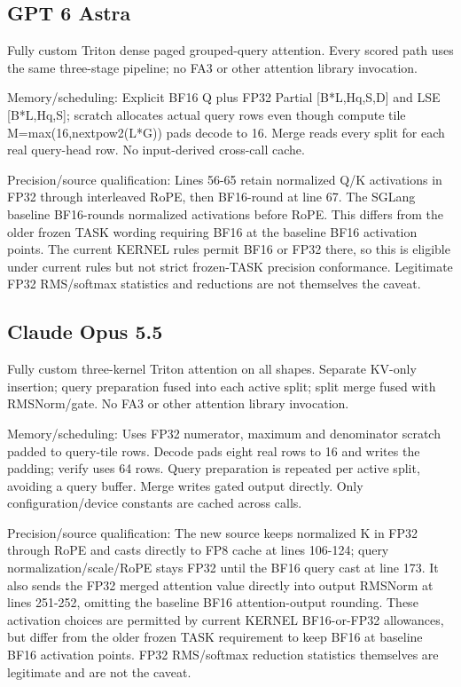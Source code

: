 \documentclass[11pt,letterpaper]{article}
\begin{document}
\subsection*{GPT 6 Astra}

Fully custom Triton dense paged grouped-query attention. Every scored path uses the same three-stage pipeline; no FA3 or other attention library invocation.

Memory/scheduling: Explicit BF16 Q plus FP32 Partial [B*L,Hq,S,D] and LSE [B*L,Hq,S]; scratch allocates actual query rows even though compute tile M=max(16,nextpow2(L*G)) pads decode to 16. Merge reads every split for each real query-head row. No input-derived cross-call cache.

Precision/source qualification: Lines 56-65 retain normalized Q/K activations in FP32 through interleaved RoPE, then BF16-round at line 67. The SGLang baseline BF16-rounds normalized activations before RoPE. This differs from the older frozen TASK wording requiring BF16 at the baseline BF16 activation points. The current KERNEL rules permit BF16 or FP32 there, so this is eligible under current rules but not strict frozen-TASK precision conformance. Legitimate FP32 RMS/softmax statistics and reductions are not themselves the caveat.

\subsection*{Claude Opus 5.5}

Fully custom three-kernel Triton attention on all shapes. Separate KV-only insertion; query preparation fused into each active split; split merge fused with RMSNorm/gate. No FA3 or other attention library invocation.

Memory/scheduling: Uses FP32 numerator, maximum and denominator scratch padded to query-tile rows. Decode pads eight real rows to 16 and writes the padding; verify uses 64 rows. Query preparation is repeated per active split, avoiding a query buffer. Merge writes gated output directly. Only configuration/device constants are cached across calls.

Precision/source qualification: The new source keeps normalized K in FP32 through RoPE and casts directly to FP8 cache at lines 106-124; query normalization/scale/RoPE stays FP32 until the BF16 query cast at line 173. It also sends the FP32 merged attention value directly into output RMSNorm at lines 251-252, omitting the baseline BF16 attention-output rounding. These activation choices are permitted by current KERNEL BF16-or-FP32 allowances, but differ from the older frozen TASK requirement to keep BF16 at baseline BF16 activation points. FP32 RMS/softmax reduction statistics themselves are legitimate and are not the caveat.
\end{document}

